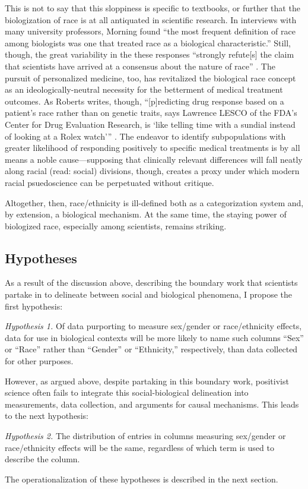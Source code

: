 This is not to say that this sloppiness is specific to textbooks, or further that the biologization of race is at all antiquated in scientific research. In interviews with many university professors, Morning found ``the most frequent definition of race among biologists was one that treated race as a biological characteristic.'' Still, though, the great variability in the these responses ``strongly refute[s] the claim that scientists have arrived at a consensus about the nature of race'' \cite{morning2011nature}. The pursuit of personalized medicine, too, has revitalized the biological race concept as an ideologically-neutral necessity for the betterment of medical treatment outcomes. As Roberts writes, though, ``[p]redicting drug response based on a patient's race rather than on genetic traits, says Lawrence LESCO of the FDA's Center for Drug Evaluation Research, is `like telling time with a sundial instead of looking at a Rolex watch'\thinspace'' \cite{roberts2011fatal}. The endeavor to identify subpopulations with greater likelihood of responding positively to specific medical treatments is by all means a noble cause---supposing that clinically relevant differences will fall neatly along racial (read: social) divisions, though, creates a proxy under which modern racial psuedoscience can be perpetuated without critique.

Altogether, then, race/ethnicity is ill-defined both as a categorization system and, by extension, a biological mechanism. At the same time, the staying power of biologized race, especially among scientists, remains striking.


\subsection{Hypotheses}\label{sec:hyps}

As a result of the discussion above, describing the boundary work that scientists partake in to delineate between social and biological phenomena, I propose the first hypothesis:

\textit{Hypothesis 1.} Of data purporting to measure sex/gender or race/ethnicity effects, data for use in biological contexts will be more likely to name such columns ``Sex'' or ``Race'' rather than ``Gender'' or ``Ethnicity,'' respectively, than data collected for other purposes.

However, as argued above, despite partaking in this boundary work, positivist science often fails to integrate this social-biological delineation into measurements, data collection, and arguments for causal mechanisms. This leads to the next hypothesis:

\textit{Hypothesis 2.} The distribution of entries in columns measuring sex/gender or race/ethnicity effects will be the same, regardless of which term is used to describe the column.

The operationalization of these hypotheses is described in the next section.


